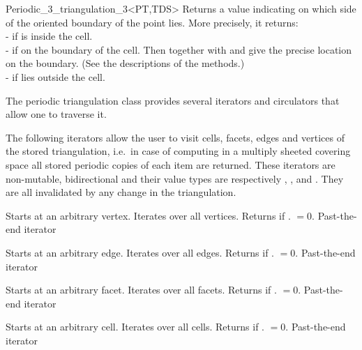 \begin{ccRefClass}{Periodic_3_triangulation_3<PT,TDS>}
{Returns a value indicating on which side of the oriented boundary
of  the point  lies. More precisely, it returns:\\
-  if  is inside the cell.\\
-  if  on the boundary of the cell. Then
 together with  and  give the precise location
on the boundary. (See the descriptions of the  methods.)\\ 
-  if  lies outside the cell.
}


The periodic triangulation class provides several iterators and circulators
that allow one to traverse it.


The following iterators allow the user to visit cells,
facets, edges and vertices of the stored triangulation, i.e.\ in case
of computing in a multiply sheeted covering space all stored periodic
copies of each item are returned.
These iterators are non-mutable, bidirectional and
their value types are respectively , , 
and . They are all invalidated by any change in the
triangulation. 

{Starts at an arbitrary vertex. Iterates over all vertices. Returns
   if \ccVar. $=0$.}  
\ccGlue
{}
{Past-the-end iterator}

{Starts at an arbitrary edge. Iterates over all edges. Returns
   if \ccVar. $=0$.}
\ccGlue
{}
{Past-the-end iterator}

{Starts at an arbitrary facet. Iterates over all facets. Returns
   if \ccVar. $=0$.}
\ccGlue
{}
{Past-the-end iterator}

{Starts at an arbitrary cell. Iterates over all cells. Returns
   if \ccVar. $=0$.} 
\ccGlue
{}
{Past-the-end iterator}


\end{ccRefClass}
